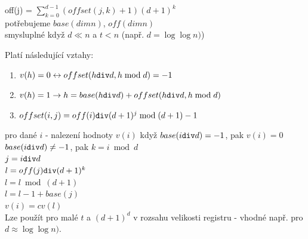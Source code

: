 off(j) = $\sum_{k=0}^{d-1}(offset(j,k) + 1)(d+1)^k$ \\
potřebujeme $base(dim n)$, $off(dim n)$ \\
smysluplné když $d \ll n$ a $t < n$ (např. $d = \log \log n)$)

Platí následující vztahy: 
\begin{enumerate}
\item $v(h) = 0 \leftrightarrow offset(h {\tt div} d, h \bmod d) = -1$
\item $v(h) = 1 \rightarrow h = base(h {\tt div} d) + offset(h {\tt div} d, h
\bmod d)$
\item $offset(i, j) = off(i) {\tt div} (d+1)^j \bmod (d+1) - 1$
\end{enumerate}
\par

pro dané $i$ - nalezení hodnoty $v(i)$
když $base(i {\tt div } d) = -1$, pak $v(i) = 0$ \\
$base(i {\tt div } d) \neq -1$, pak $k = i \bmod d$ \\
$j = i {\tt div } d$ \\
$l = off(j) {\tt div } (d+1)^k$ \\
$l = l \bmod (d+1)$ \\
$l = l - 1 + base(j)$ \\
$v(i) = cv(l)$ \\

Lze použít pro malé $t$ a $(d+1)^d$ v rozsahu velikosti registru - vhodné
např. pro $d \approx \log \log n)$.

